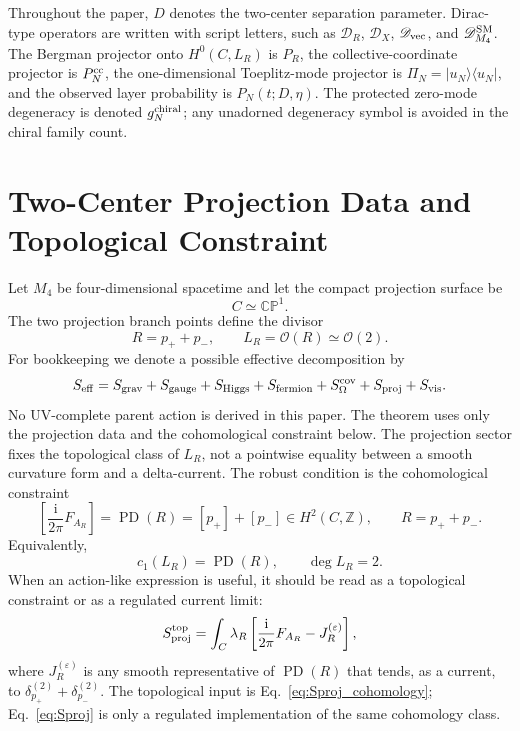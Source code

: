 \documentclass[aps,prd,preprint,notitlepage,nofootinbib,superscriptaddress,floatfix]{revtex4-2}
\newcommand{\ii}{\mathrm{i}}
\newcommand{\cO}{\mathcal O}
\newcommand{\CP}{\mathbb{CP}}
\newcommand{\scrD}{\mathscr D}
\theoremstyle{remark}
\begin{document}
Throughout the paper, \(D\) denotes the two-center separation parameter.
Dirac-type operators are written with script letters, such as \(\scrD_R\), \(\scrD_X\), \(\scrD_{\rm vec}\), and \(\scrD_{M_4}^{\rm SM}\).
The Bergman projector onto \(H^0(C,L_R)\) is \(P_R\), the collective-coordinate projector is \(P_N^{\rm cc}\), the one-dimensional Toeplitz-mode projector is \(\Pi_N=|u_N\rangle\langle u_N|\), and the observed layer probability is \(P_N(t;D,\eta)\).
The protected zero-mode degeneracy is denoted \(g_N^{\rm chiral}\); any unadorned degeneracy symbol is avoided in the chiral family count.

\section{Two-Center Projection Data and Topological Constraint}
\label{sec:parent_data}

Let \(M_4\) be four-dimensional spacetime and let the compact projection surface be
\begin{equation}
C\simeq\CP^1.
\end{equation}
The two projection branch points define the divisor
\begin{equation}
R=p_+ + p_-,
\qquad
L_R=\cO(R)\simeq\cO(2).
\label{eq:LR_def}
\end{equation}
For bookkeeping we denote a possible effective decomposition by
\begin{equation}
S_{\rm eff}
=
S_{\rm grav}
+S_{\rm gauge}
+S_{\rm Higgs}
+S_{\rm fermion}
+S_\Omega^{\rm cov}
+S_{\rm proj}
+S_{\rm vis}.
\label{eq:parent_action}
\end{equation}
No UV-complete parent action is derived in this paper.
The theorem uses only the projection data and the cohomological constraint below.
The projection sector fixes the topological class of \(L_R\), not a pointwise equality between a smooth curvature form and a delta-current.
The robust condition is the cohomological constraint
\begin{equation}
\boxed{
\left[\frac{\ii}{2\pi}F_{A_R}\right]
=
\operatorname{PD}(R)
=
[p_+]+[p_-]
\in H^2(C,\mathbb Z),
\qquad
R=p_+ + p_-.
}
\label{eq:Sproj_cohomology}
\end{equation}
Equivalently,
\begin{equation}
c_1(L_R)=\operatorname{PD}(R),
\qquad
\deg L_R=2.
\label{eq:degree_LR}
\end{equation}
When an action-like expression is useful, it should be read as a topological constraint or as a regulated current limit:
\begin{equation}
S_{\rm proj}^{\rm top}
=
\int_C\lambda_R
\left[
\frac{\ii}{2\pi}F_{A_R}
-J_R^{(\varepsilon)}
\right],
\label{eq:Sproj}
\end{equation}
where \(J_R^{(\varepsilon)}\) is any smooth representative of \(\operatorname{PD}(R)\) that tends, as a current, to \(\delta_{p_+}^{(2)}+\delta_{p_-}^{(2)}\).
The topological input is Eq.~\eqref{eq:Sproj_cohomology}; Eq.~\eqref{eq:Sproj} is only a regulated implementation of the same cohomology class.
\end{document}
